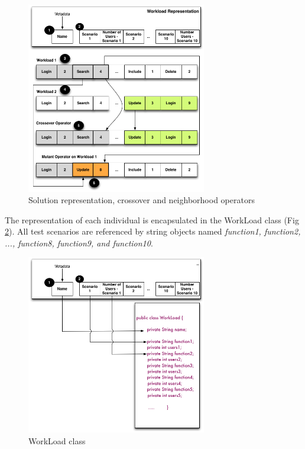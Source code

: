 \documentclass{report}
\begin{document}
\begin{figure}[h]
\centering
\includegraphics[width=0.7\textwidth]{./images/genomere.png}
\caption{Solution representation, crossover  and neighborhood operators \cite{Gois2016}}
\label{fig:solution}
\end{figure}

The representation of each individual is encapsulated in the WorkLoad class (Fig \ref{fig:genomeimpl}). All test scenarios are referenced by string objects named \textit{function1, function2, ..., function8, function9, and function10}.


\begin{figure}[!h]
\centering
\includegraphics[width=0.7\textwidth]{./images/genomeimpl.png}
\caption{WorkLoad class}
\label{fig:genomeimpl}
\end{figure} 
\end{document}
